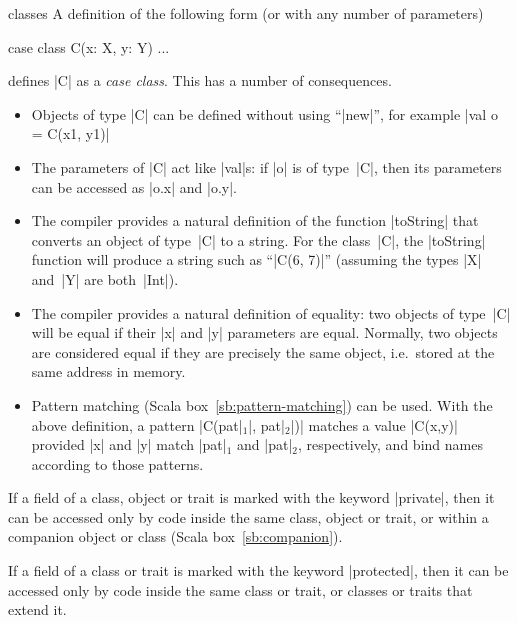 \begin{scalaBox}{\protect{} classes}
\label{sb:case-classes}
A definition of the following form (or with any number of parameters)
\begin{scala}
  case class C(x: X, y: Y) { ... }
\end{scala}
%
defines |C| as a \emph{case class}.  This has a number of consequences.
\begin{itemize}
\item Objects of type |C| can be defined without using ``|new|'', for example
|val o = C(x1, y1)|

\item The parameters of |C| act like |val|s: if |o| is of type~|C|, then its
  parameters can be accessed as |o.x| and |o.y|.

\item The compiler provides a natural definition of the function |toString|
  that converts an object of type~|C| to a string.  For the class~|C|, the
  |toString| function will produce a string such as ``|C(6, 7)|'' (assuming
  the types |X| and~|Y| are both~|Int|).

\item The compiler provides a natural definition of equality: two objects of
  type~|C| will be equal if their |x| and |y| parameters are equal.  Normally,
  two objects are considered equal if they are precisely the same object,
  i.e.~stored at the same address in memory. 


\item Pattern matching (Scala box~\ref{sb:pattern-matching}) can be used.
  With the above definition, a pattern |C(pat|$_1$|, pat|$_2$|)| matches a
  value |C(x,y)| provided |x| and |y| match |pat|$_1$ and |pat|$_2$,
  respectively, and bind names according to those patterns.
\end{itemize}
\end{scalaBox}


\begin{scalaBox}{\protect{}}
\label{sb:private}
If a field of a class, object or trait is marked with the keyword |private|,
then it can be accessed only by code inside the same class, object or trait,
or within a companion object or class (Scala box~\ref{sb:companion}).
\end{scalaBox}


\begin{scalaBox}{}
\label{sb:protected}
If a field of a class or trait is marked with the keyword |protected|, then it 
can be accessed only by code inside the same class or trait, or classes or
traits that extend it.
\end{scalaBox}
